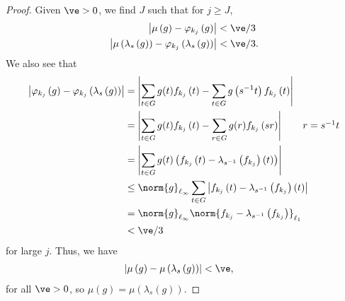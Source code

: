 \begin{proof}
  Given $\ve > 0$, we find $J$ such that for $j\geq J$,
  \begin{align*}
    \left\vert \mu\left(g\right) - \varphi_{k_j}\left(g\right) \right\vert &< \ve/3\\
    \left\vert \mu\left(\lambda_s\left(g\right)\right) - \varphi_{k_j}\left(\lambda_s\left(g\right)\right)\right\vert &< \ve/3.
  \end{align*}
  We also see that
  \begin{align*}
    \left\vert \varphi_{k_j}\left(g\right) - \varphi_{k_j}\left(\lambda_s\left(g\right)\right) \right\vert &= \left\vert \sum_{t\in G}g(t)f_{k_j}\left(t\right) - \sum_{t\in G}g\left(s^{-1}t\right)f_{k_j}\left(t\right) \right\vert\\
                                                                                                           &= \left\vert \sum_{t\in G}g(t)f_{k_j}\left(t\right) - \sum_{r\in G}g(r)f_{k_j}\left(sr\right) \right\vert \tag*{$r = s^{-1}t$}\\
                                                                                                           &= \left\vert \sum_{t\in G}g(t)\left(f_{k_j}\left(t\right)-\lambda_{s^{-1}}\left(f_{k_j}\right)\left(t\right)\right) \right\vert\\
                                                                                                           &\leq \norm{g}_{\ell_\infty}\sum_{t\in G}\left\vert f_{k_j}\left(t\right) - \lambda_{s^{-1}}\left(f_{k_j}\right)\left(t\right) \right\vert\\
                                                                                                           &= \norm{g}_{\ell_\infty}\norm{f_{k_j} - \lambda_{s^{-1}}\left(f_{k_j}\right)}_{\ell_1}\\
                                                                                                           &< \ve/3
  \end{align*}
  for large $j$. Thus, we have
  \begin{align*}
    \left\vert \mu\left(g\right) - \mu\left(\lambda_{s}\left(g\right)\right) \right\vert &< \ve,
  \end{align*}
  for all $\ve > 0$, so $\mu\left(g\right) = \mu\left(\lambda_{s}\left(g\right)\right)$.
\end{proof}
